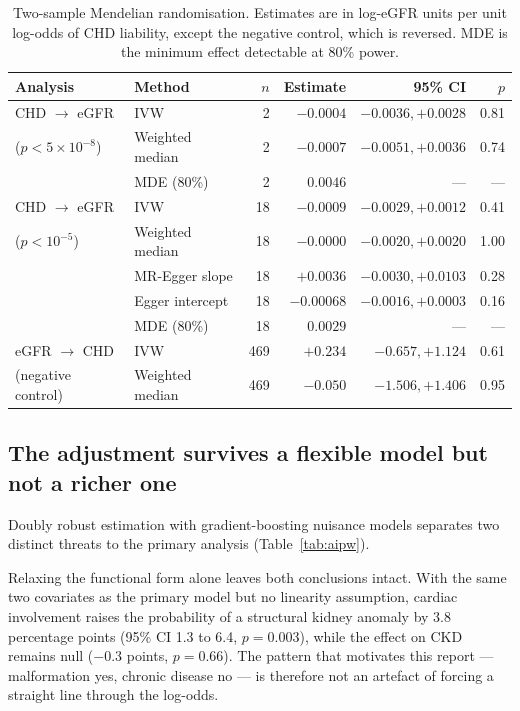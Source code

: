 \documentclass[11pt,a4paper]{article}
\begin{document}
\begin{table}[H]
\centering
\small
\caption[Mendelian randomisation results]{Two-sample Mendelian randomisation. Estimates are
in log-eGFR units per unit log-odds of CHD liability, except the negative control, which is
reversed. MDE is the minimum effect detectable at 80\% power.}
\label{tab:mr}
\begin{tabular}{llrrrr}
\toprule
Analysis & Method & $n$ & Estimate & 95\% CI & $p$ \\
\midrule
CHD $\rightarrow$ eGFR      & IVW             & 2  & $-0.0004$ & $-0.0036, +0.0028$ & 0.81 \\
($p<5\times10^{-8}$)        & Weighted median & 2  & $-0.0007$ & $-0.0051, +0.0036$ & 0.74 \\
                            & MDE (80\%)      & 2  & $0.0046$  & ---                & ---  \\
\addlinespace
CHD $\rightarrow$ eGFR      & IVW             & 18 & $-0.0009$ & $-0.0029, +0.0012$ & 0.41 \\
($p<10^{-5}$)               & Weighted median & 18 & $-0.0000$ & $-0.0020, +0.0020$ & 1.00 \\
                            & MR-Egger slope  & 18 & $+0.0036$ & $-0.0030, +0.0103$ & 0.28 \\
                            & Egger intercept & 18 & $-0.00068$& $-0.0016, +0.0003$ & 0.16 \\
                            & MDE (80\%)      & 18 & $0.0029$  & ---                & ---  \\
\addlinespace
eGFR $\rightarrow$ CHD      & IVW             & 469& $+0.234$  & $-0.657, +1.124$   & 0.61 \\
(negative control)          & Weighted median & 469& $-0.050$  & $-1.506, +1.406$   & 0.95 \\
\bottomrule
\end{tabular}
\end{table}

\subsection{The adjustment survives a flexible model but not a richer one}
\label{sec:aipwresults}

Doubly robust estimation with gradient-boosting nuisance models separates two distinct
threats to the primary analysis (Table~\ref{tab:aipw}).

Relaxing the functional form alone leaves both conclusions intact. With the same two
covariates as the primary model but no linearity assumption, cardiac involvement raises the
probability of a structural kidney anomaly by 3.8 percentage points (95\% CI 1.3 to 6.4,
$p = 0.003$), while the effect on CKD remains null ($-0.3$ points, $p = 0.66$). The pattern
that motivates this report --- malformation yes, chronic disease no --- is therefore not an
artefact of forcing a straight line through the log-odds.
\end{document}
